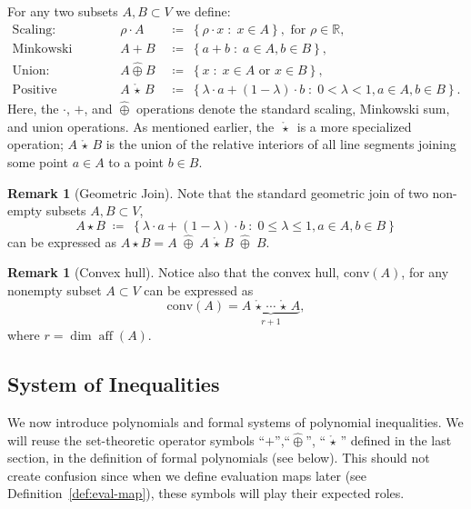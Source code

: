 \documentclass[10pt]{amsart}
\theoremstyle{plain}
\theoremstyle{definition}
\newtheorem{remark}[lemma]{Remark}
\let\leq\leqslant
\providecommand{\defeq}[0]{\ensuremath{\;\coloneqq\;}\xspace}
\providecommand{\cplus}[0]{\ensuremath{\hat{\oplus}}\xspace}
\providecommand{\cmult}[0]{\ensuremath{{\,\mathring{\star}\,}}\xspace}
\providecommand{\mink}[0]{\ensuremath{+}\xspace}
\providecommand{\scal}[0]{\ensuremath{\cdot}\xspace}
\providecommand{\conv}[1]{\ensuremath{\mathrm{conv}{\left({#1}\right)}\xspace}}
\begin{document}
For any two subsets $A,B \subset V$ we define:
\begin{align}
    \text{Scaling:} && \rho\scal A &\defeq \left\{ \rho\cdot x \;\colon\; x\in A\right\},\text{ for $\rho \in \mathbb{R}$}, \\
    \text{Minkowski sum:} && A \mink B &\defeq \left\{a+b \;\colon\; a\in A, b\in B\right\}, \\
    \text{Union:} && A \cplus B &\defeq \left\{ x \;\colon\; x\in A\text{ or }x\in B\right\},\\
    \text{Positive Geometric Join:} && A\cmult B &\defeq \left\{\lambda\cdot a + (1-\lambda)\cdot b \;\colon\; 0<\lambda < 1,a\in A, b\in B\right\}.\label{eqn:pgj-def}
\end{align}
Here, the $\cdot$, $+$, and $\cplus$ operations denote the standard scaling, Minkowski sum, and union operations. 
As mentioned earlier,
the $\cmult$ is a more specialized operation;
$A\cmult B$ is the union
of the relative interiors of all line segments joining some point $a\in A$ to a point $b\in B$. 
\begin{remark}[Geometric Join]
    Note that the standard geometric join of two non-empty subsets $A, B \subset V$,
        $$A\star B \defeq \left\{\lambda\cdot a + (1-\lambda)\cdot b \;:\; 0\leq \lambda \leq 1, a\in A, b\in B\right\}$$
    can be expressed as $A\star B = A \;\cplus\; A\cmult B \;\cplus\; B$.
\end{remark}

\begin{remark}[Convex hull]
    Notice also that the convex hull, $\conv{A}$,  for any nonempty subset 
    $A \subset V$ can be expressed as
    \[
    \conv A  = \underbrace{A \cmult \cdots \cmult A}_{r+1},
    \]
    where $r =\dim\operatorname{aff}(A)$.
\end{remark}



\subsection{System of Inequalities}
\label{subsec:formal-systems}
We now introduce polynomials and formal systems of polynomial inequalities. We will reuse the set-theoretic operator symbols 
``$+$'',``$\cplus$'', ``$\cmult$'' defined in the last section, 
in the definition of formal polynomials (see below). This should not create confusion since when we define evaluation maps later (see Definition~\ref{def:eval-map}), these symbols will play their 
expected roles. 
\end{document}
